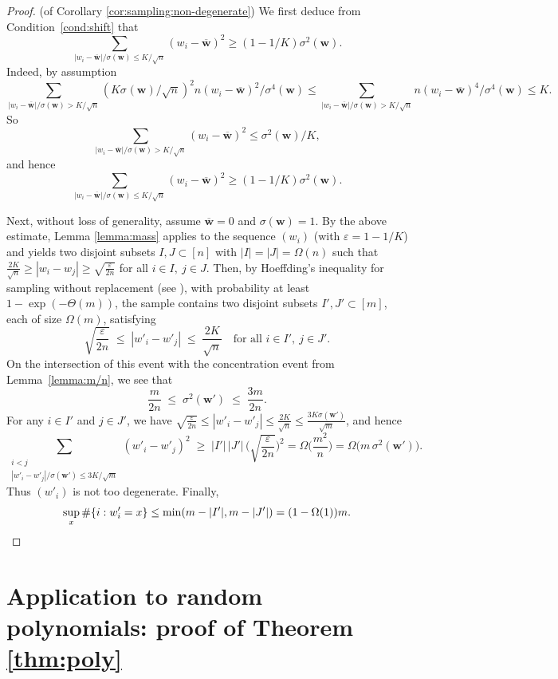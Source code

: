 \documentclass[reqno]{amsart}
\newcommand\eps{{\varepsilon}}
\newcommand\BMw{{\bm w}}
\theoremstyle{plain}
\theoremstyle{definition}
\begin{document}
\begin{proof}(of Corollary \ref{cor:sampling:non-degenerate}) We first deduce from Condition~\ref{cond:shift} that
$$\sum_{|w_{i} - \overline{\BMw}|/\sigma(\BMw) \le  K /\sqrt{n}}  (w_i-\overline{\BMw})^2 \ge (1-1/K) \sigma^{2}(\BMw).$$
Indeed, by assumption
$$\sum_{|w_{i} - \overline{\BMw}|/\sigma(\BMw) > K /\sqrt{n}}  (K \sigma^{}(\BMw)/\sqrt{n})^{2} n(w_i-\overline{\BMw})^2/\sigma^{4}(\BMw)  \le \sum_{|w_{i} - \overline{\BMw}|/\sigma(\BMw) > K /\sqrt{n}}  n(w_i-\overline{\BMw})^4/\sigma^{4}(\BMw)  \le K.$$
So 
$$\sum_{|w_{i} - \overline{\BMw}|/\sigma(\BMw) > K /\sqrt{n}}  (w_i-\overline{\BMw})^2 \le \sigma^{2}(\BMw)/K,$$ 
and hence 
$$\sum_{|w_{i} - \overline{\BMw}|/\sigma(\BMw) \le K /\sqrt{n}}  (w_i-\overline{\BMw})^2 \ge (1-1/K)\sigma^{2}(\BMw).$$

Next, without loss of generality, assume $\overline{\BMw}=0$ and $\sigma(\BMw)=1$. By the above estimate, Lemma \ref{lemma:mass} applies to the sequence $(w_i)$ (with $\eps =1-1/K$) and yields two disjoint subsets $I,J \subset [n]$ with $|I|=|J|=\Omega(n)$ such that $\tfrac{2K}{\sqrt{n}}\ge |w_i - w_j| \ge \sqrt{\tfrac{\eps}{2n}}$
for all $i \in I, \ j \in J$. Then, by Hoeffding's inequality for sampling without replacement (see \cite{Hoeffding1963}), with probability at least $1-\exp(-\Theta(m))$, the sample contains two disjoint subsets $I', J'\subset [m]$, each of size $\Omega(m)$, satisfying 
\[
\sqrt{\frac{\eps}{2n}} \;\le\; |w'_i - w'_j| \;\le\; \frac{2K}{\sqrt{n}}
\quad \text{for all } i\in I',\ j\in J'.
\] 
On the intersection of this event with the concentration event from Lemma~\ref{lemma:m/n}, we see that
\[
\frac{m}{2n}\;\le\;\sigma^{2}(\BMw')\;\le\;\frac{3m}{2n}.
\]
For any $i\in I'$ and $j\in J'$, we have 
$\sqrt{\tfrac{\eps}{2n}} \le |w'_i-w'_j| \le \tfrac{2K}{\sqrt{n}} \le \tfrac{3K\sigma(\BMw')}{\sqrt{m}}$, and hence
\[
\sum_{\substack{i<j \\ |w'_i - w'_j|/\sigma(\BMw') \le 3K/\sqrt{m}}} (w'_{i} - w'_{j})^{2} 
\;\ge\; |I'|\,|J'| \,\Big(\sqrt{\frac{\eps}{2n}}\Big)^{2}
= \Omega \Big(\frac{m^2}{n}\Big)
= \Omega \big(m \,\sigma^{2}(\BMw')\big).
\]
Thus $(w'_i)$ is not too degenerate. Finally, 
\[
\sup_{x}\#\{i : w'_i = x\} \le \min(m-|I'|,m-|J'|) = (1-\Omega(1))m. \qedhere
\]
\end{proof}


\section{Application to random polynomials: proof of Theorem \ref{thm:poly}}\label{sect:application} 
\end{document}
